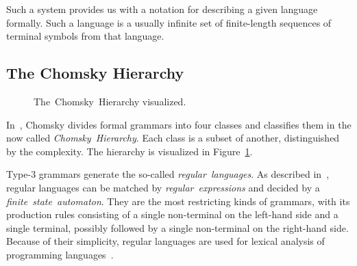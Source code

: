 \documentclass[english,bachelors,forcepolishlogotype]{wizthesis}
\begin{document}
Such a system provides us with a notation for describing a given
language formally. Such a language is a usually infinite set of finite-length
sequences of terminal symbols from that language.

\subsection{The Chomsky Hierarchy}

\begin{figure}
  \centering
  \caption{The~Chomsky~Hierarchy visualized.}
  \label{fig:chomsky-hierarchy}
\end{figure}

In~\cite{chomsky-1956}, Chomsky divides formal grammars into four classes and
classifies them in the now called \emph{Chomsky~Hierarchy}. Each class is a
subset of another, distinguished by the complexity. The hierarchy is visualized
in Figure~\ref{fig:chomsky-hierarchy}.

Type-3 grammars generate the so-called \emph{regular~languages}. As described
in~\cite{aho-1990}, regular languages can be matched by
\emph{regular~expressions} and decided by a \emph{finite~state~automaton}. They
are the most restricting kinds of grammars, with its production rules consisting
of a single non-terminal on the left-hand side and a single terminal, possibly
followed by a single non-terminal on the right-hand side. Because of their
simplicity, regular languages are used for lexical analysis of programming
languages~\cite{johnson-1968}.
\end{document}
